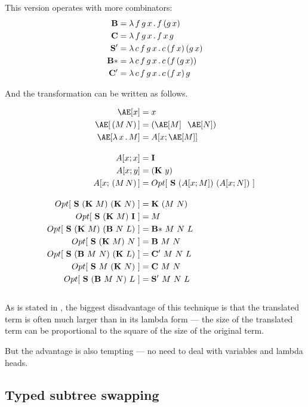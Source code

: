 \documentclass[12pt,a4paper]{report}
\begin{document}
This version operates with more combinators:\\

\begin{align*}
\mathbf{B}  &= \lambda \, f\,g\,x \, . \, f\,(g\,x) \\
\mathbf{C}  &= \lambda \, f\,g\,x \, . \, f\,x\,g \\
\mathbf{S'} &= \lambda \, c\,f\,g\,x \, . \, c\,(f\,x)\,(g\,x) \\
\mathbf{B*} &= \lambda \, c\,f\,g\,x \, . \, c\,(f\,(g\,x)) \\
\mathbf{C'} &= \lambda \, c\,f\,g\,x \, . \, c\,(f\,x)\,g \\
\end{align*}

\newpage
And the transformation can be written as follows.

\begin{align*}
\Ae[x]           &= x &\\
\Ae[\,(M\,N)\,]  &= (\Ae[M]\;\;\Ae[N]) &\\
\Ae[\lam{x}{M}]  &= A[ x ; \Ae[M] ] &
\\[1em]
A[x;x]           &= \Icomb &\\
A[x;y]           &= (\Kcomb~y)\\
A[x;\,(M\,N)\,]  &= Opt[~\Scomb~(A[x;M])~(A[x;N])~]
\\[1em]
Opt[~\Scomb~(\Kcomb~M)~(\Kcomb~N)~]   &= \Kcomb~(M~N)\\
Opt[~\Scomb~(\Kcomb~M)~\Icomb~]       &= M\\
Opt[~\Scomb~(\Kcomb~M)~(\Bcomb~N~L)~] &= \BBcomb~M~N~L\\
Opt[~\Scomb~(\Kcomb~M)~N~]            &= \Bcomb~M~N\\
Opt[~\Scomb~(\Bcomb~M~N)~(\Kcomb~L)~] &= \CCcomb~M~N~L\\
Opt[~\Scomb~M~(\Kcomb~N)~]            &= \Ccomb~M~N\\
Opt[~\Scomb~(\Bcomb~M~N)~L~]          &= \SScomb~M~N~L
\end{align*}
\\

As is stated in \cite{jones87},
the biggest disadvantage of this technique is that the translated
term is often much larger than in its lambda form --- the size of
the translated term can be proportional to the
square of the size of the original term. 

But the advantage is also tempting --- no need to deal with variables
and lambda heads.


\subsection{Typed subtree swapping}
\label{typed-swapping}
\end{document}
